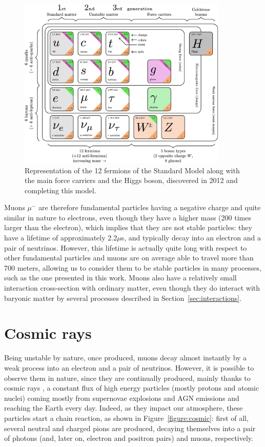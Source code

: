 \documentclass[a4paper, 11pt]{report}
\begin{document}
\begin{figure}[htbp]
\begin{center}
\includegraphics[width=10cm, height=8.2cm]{figs/SMFermions.png}
\caption{Representation of the 12 fermions of the Standard Model \cite{SMFermions} along with the main force carriers and the Higgs boson, discovered in 2012 and completing this model.}
\label{figure:SMFermions}
\end{center}
\end{figure}

Muons $\mu^{-}$ \cite{PDGMuons} are therefore fundamental particles having a negative charge and quite similar in nature to electrons, even though they have a higher mass (200 times larger than the electron), which implies that they are not stable particles: they have a lifetime of approximately 2.2$\mu$s, and typically decay into an electron and a pair of neutrinos. However, this lifetime is actually quite long with respect to other fundamental particles and muons are on average able to travel more than 700 meters, allowing us to consider them to be stable particles in many processes, such as the one presented in this work. Muons also have a relatively small interaction cross-section with ordinary matter, even though they do interact with baryonic matter by several processes described in Section~\ref{sec:interactions}.

\section{Cosmic rays} \label{sec:cosmicRays}

Being unstable by nature, once produced, muons decay almost instantly by a weak process into an electron and a pair of neutrinos. However, it is possible to observe them in nature, since they are continually produced, mainly thanks to cosmic rays \cite{cosmicPDG}, a constant flux of high energy particles (mostly protons and atomic nuclei) coming mostly from supernovae explosions and AGN emissions and reaching the Earth every day. Indeed, as they impact our atmosphere, these particles start a chain reaction, as shown in Figure~\ref{figure:cosmic}: first of all, several neutral and charged pions are produced, decaying themselves into a pair of photons (and, later on, electron and positron pairs) and muons, respectively.
\end{document}
